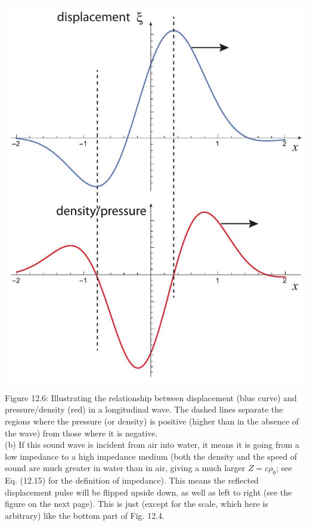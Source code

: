 \documentclass[10pt]{article}
\begin{document}
\begin{center}
\includegraphics[max width=\textwidth]{2024_09_14_9969b06773f10b6936e8g-314}
\end{center}

Figure 12.6: Illustrating the relationship between displacement (blue curve) and pressure/density (red) in a longitudinal wave. The dashed lines separate the regions where the pressure (or density) is positive (higher than in the absence of the wave) from those where it is negative.\\
(b) If this sound wave is incident from air into water, it means it is going from a low impedance to a high impedance medium (both the density and the speed of sound are much greater in water than in air, giving a much larger $Z=c \rho_{0}$; see Eq. (12.15) for the definition of impedance). This means the reflected displacement pulse will be flipped upside down, as well as left to right (see the figure on the next page). This is just (except for the scale, which here is arbitrary) like the bottom part of Fig. 12.4.
\end{document}
